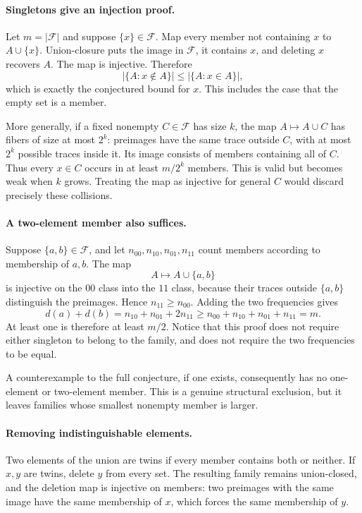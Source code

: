 \documentclass[11pt]{article}
\begin{document}
\paragraph{Singletons give an injection proof.}
Let $m=|\mathcal F|$ and suppose $\{x\}\in\mathcal F$. Map every member not containing $x$ to $A\cup\{x\}$. Union-closure puts the image in $\mathcal F$, it contains $x$, and deleting $x$ recovers $A$. The map is injective. Therefore
\[
 |\{A:x\notin A\}|\le|\{A:x\in A\}|,
\]
which is exactly the conjectured bound for $x$. This includes the case that the empty set is a member.

More generally, if a fixed nonempty $C\in\mathcal F$ has size $k$, the map $A\mapsto A\cup C$ has fibers of size at most $2^k$: preimages have the same trace outside $C$, with at most $2^k$ possible traces inside it. Its image consists of members containing all of $C$. Thus every $x\in C$ occurs in at least $m/2^k$ members. This is valid but becomes weak when $k$ grows. Treating the map as injective for general $C$ would discard precisely these collisions.

\paragraph{A two-element member also suffices.}
Suppose $\{a,b\}\in\mathcal F$, and let $n_{00},n_{10},n_{01},n_{11}$ count members according to membership of $a,b$. The map
\[
 A\longmapsto A\cup\{a,b\}
\]
is injective on the $00$ class into the $11$ class, because their traces outside $\{a,b\}$ distinguish the preimages. Hence $n_{11}\ge n_{00}$. Adding the two frequencies gives
\[
 d(a)+d(b)=n_{10}+n_{01}+2n_{11}
 \ge n_{00}+n_{10}+n_{01}+n_{11}=m.
\]
At least one is therefore at least $m/2$. Notice that this proof does not require either singleton to belong to the family, and does not require the two frequencies to be equal.

A counterexample to the full conjecture, if one exists, consequently has no one-element or two-element member. This is a genuine structural exclusion, but it leaves families whose smallest nonempty member is larger.

\paragraph{Removing indistinguishable elements.}
Two elements of the union are twins if every member contains both or neither. If $x,y$ are twins, delete $y$ from every set. The resulting family remains union-closed, and the deletion map is injective on members: two preimages with the same image have the same membership of $x$, which forces the same membership of $y$.
\end{document}
